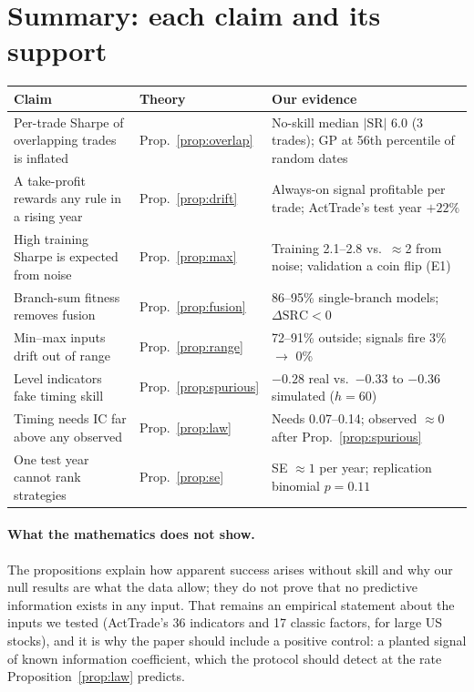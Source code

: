 \documentclass[11pt,a4paper]{article}
\theoremstyle{remark}
\newcommand{\SR}{\mathrm{SR}}
\begin{document}
\section{Summary: each claim and its support}
\begin{center}
\small
\begin{tabular}{p{4.6cm}p{3.4cm}p{6.2cm}}
\toprule
Claim & Theory & Our evidence \\
\midrule
Per-trade Sharpe of overlapping trades is inflated & Prop.~\ref{prop:overlap} & No-skill median $|\SR|$ 6.0 (3 trades); GP at 56th percentile of random dates \\
A take-profit rewards any rule in a rising year & Prop.~\ref{prop:drift} & Always-on signal profitable per trade; ActTrade's test year $+22\%$ \\
High training Sharpe is expected from noise & Prop.~\ref{prop:max} & Training 2.1--2.8 vs.\ $\approx$2 from noise; validation a coin flip (E1) \\
Branch-sum fitness removes fusion & Prop.~\ref{prop:fusion} & 86--95\% single-branch models; $\Delta\mathrm{SRC}<0$ \\
Min--max inputs drift out of range & Prop.~\ref{prop:range} & 72--91\% outside; signals fire 3\% $\to$ 0\% \\
Level indicators fake timing skill & Prop.~\ref{prop:spurious} & $-0.28$ real vs.\ $-0.33$ to $-0.36$ simulated ($h=60$) \\
Timing needs IC far above any observed & Prop.~\ref{prop:law} & Needs 0.07--0.14; observed $\approx0$ after Prop.~\ref{prop:spurious} \\
One test year cannot rank strategies & Prop.~\ref{prop:se} & SE $\approx1$ per year; replication binomial $p=0.11$ \\
\bottomrule
\end{tabular}
\end{center}

\paragraph{What the mathematics does not show.} The propositions explain how apparent success arises without skill and why our null results are what the data allow; they do not prove that no predictive information exists in any input. That remains an empirical statement about the inputs we tested (ActTrade's 36 indicators and 17 classic factors, for large US stocks), and it is why the paper should include a positive control: a planted signal of known information coefficient, which the protocol should detect at the rate Proposition~\ref{prop:law} predicts.
\end{document}
